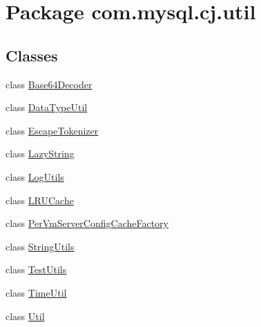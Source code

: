 \hypertarget{namespacecom_1_1mysql_1_1cj_1_1util}{}\section{Package com.\+mysql.\+cj.\+util}
\label{namespacecom_1_1mysql_1_1cj_1_1util}
\subsection*{Classes}
\begin{DoxyCompactItemize}
\item 
class \mbox{\hyperlink{classcom_1_1mysql_1_1cj_1_1util_1_1_base64_decoder}{Base64\+Decoder}}
\item 
class \mbox{\hyperlink{classcom_1_1mysql_1_1cj_1_1util_1_1_data_type_util}{Data\+Type\+Util}}
\item 
class \mbox{\hyperlink{classcom_1_1mysql_1_1cj_1_1util_1_1_escape_tokenizer}{Escape\+Tokenizer}}
\item 
class \mbox{\hyperlink{classcom_1_1mysql_1_1cj_1_1util_1_1_lazy_string}{Lazy\+String}}
\item 
class \mbox{\hyperlink{classcom_1_1mysql_1_1cj_1_1util_1_1_log_utils}{Log\+Utils}}
\item 
class \mbox{\hyperlink{classcom_1_1mysql_1_1cj_1_1util_1_1_l_r_u_cache}{L\+R\+U\+Cache}}
\item 
class \mbox{\hyperlink{classcom_1_1mysql_1_1cj_1_1util_1_1_per_vm_server_config_cache_factory}{Per\+Vm\+Server\+Config\+Cache\+Factory}}
\item 
class \mbox{\hyperlink{classcom_1_1mysql_1_1cj_1_1util_1_1_string_utils}{String\+Utils}}
\item 
class \mbox{\hyperlink{classcom_1_1mysql_1_1cj_1_1util_1_1_test_utils}{Test\+Utils}}
\item 
class \mbox{\hyperlink{classcom_1_1mysql_1_1cj_1_1util_1_1_time_util}{Time\+Util}}
\item 
class \mbox{\hyperlink{classcom_1_1mysql_1_1cj_1_1util_1_1_util}{Util}}
\end{DoxyCompactItemize}
